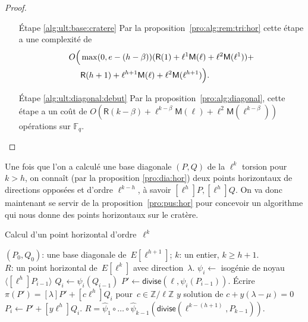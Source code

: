 \documentclass[10pt,a4paper]{book}
\theoremstyle{plain}
\theoremstyle{definition}
\theoremstyle{definition}
\theoremstyle{definition}
\theoremstyle{definition}
\theoremstyle{definition}
\theoremstyle{remark}
\theoremstyle{remark}
\theoremstyle{definition}
\begin{document}
\begin{proof}
\begin{enumerate}
\item[\'Etape \ref{alg:ult:base:cratere}] Par la proposition~\ref{pro:alg:rem:tri:hor}
cette étape a une complexité de 
\begin{equation*}
\begin{alignedat}{1}
O \Bigl( &\max(0,e-(h-\beta))(\mathsf{R}(1)+
\ell^{1}\mathsf{M}(\ell)+\ell^2 \mathsf{M}(\ell^{1}))+ \\
& \mathsf{R}(h+1)+
\ell^{h+1}\mathsf{M}(\ell)+\ell^2 \mathsf{M}(\ell^{h+1}) \Bigr) .
\end{alignedat}
\end{equation*}

\item[\'Etape \ref{alg:ult:diagonal:debut}]	Par la proposition~\ref{pro:alg:diagonal}, cette étape a un coût de $O(\mathsf{R}(k-\beta) + \ell^{k-\beta}\mathsf{M}(\ell) + \ell^2\mathsf{M}(\ell^{k-\beta}) )$ opérations sur $\mathbb{F}_q$.

\end{enumerate}
\end{proof}

Une fois que l'on a calculé une base diagonale $(P,Q)$ de la $\ell^k$ torsion 
pour $k>h$, on connaît (par la proposition \ref{pro:dia:hor}) deux points 
horizontaux  de directions opposées et d'ordre $\ell^{k-h}$, à savoir $[\ell^{h}]P, 
[\ell^{h}]Q$. On va donc maintenant se servir de la proposition~\ref{pro:pus:hor} 
pour concevoir un algorithme qui nous donne des points horizontaux sur le cratère.

\begin{algorithm}
\caption{\label{alg:hor:poi}Calcul d'un point horizontal d'ordre~$\ell^k$}
\begin{algorithmic}[1]
\REQUIRE $(P_0, Q_0)$: une base diagonale de~$E[\ell^{h+1}]$; $k$: un entier,
$k \geqslant h + 1$.\\
\ENSURE $R$: un point horizontal de~$E[\ell^k]$ avec direction~$\lambda$.
\STATE $\psi_i \gets $ isogénie de noyau~$\langle [\ell^{h}] P_{i-1} \rangle$
\STATE $Q_{i} \gets \psi_i(Q_{i-1})$
\STATE\label{alg:horizontal:divide} $P' \gets \mathsf{divise}(\ell, \psi_i(P_{i-1}))$.
\STATE\label{alg:horizontal:frob} \'Ecrire~$\pi(P') = [\lambda] P' + [c \ell^{h}] Q_i$ pour~$c \in \mathbb{Z}/\ell\mathbb{Z}$
\STATE $y$ solution de $c+y(\lambda - \mu)=0$
\STATE  $P_{i} \gets P' + [y \ell^h] Q_i$.
\ENDFOR
\RETURN\label{alg:horizontal:final} $R = \widehat{\psi}_1 \circ … \circ \widehat{\psi}_{k-1}
  (\mathsf{divise}( \ell^{k-(h+1)}, P_{k-1}) )$. 
\end{algorithmic}
\end{algorithm}
\end{document}
